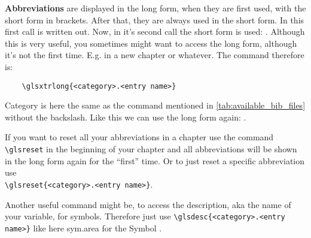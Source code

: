 \textbf{Abbreviations} are displayed in the long form, when they are first used, with the short form in brackets.
After that, they are always used in the short form. In this first call
 is written out. Now, in it's second call
the short form is used: . Although this is very
useful, you sometimes might want to access the long form, although it's not the first time.
E.g. in a new chapter or whatever. The command therefore is:

\begin{verbatim}
    \glsxtrlong{<category>.<entry name>}
\end{verbatim}

Category is here the same as the command mentioned in \cref{tab:available_bib_files}
without the backslash. Like this we can use the long form again:
.

If you want to reset all your abbreviations in a chapter use the command \verb|\glsreset| in the beginning
of your chapter and all abbreviations will be shown in the long form again for the \enquote{first}
time. Or to just reset a specific abbreviation use\\
\verb|\glsreset{<category>.<entry name>}|.

Another useful command might be, to access the description, aka the name of your variable,
for symbols. Therefore just use \verb|\glsdesc{<category>.<entry name>}| like here \glsdesc{sym.area}
for the Symbol .

